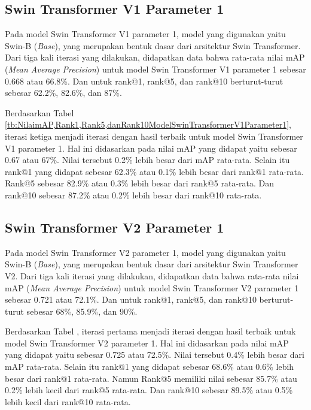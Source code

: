 \subsection{Swin Transformer V1 Parameter 1}

Pada model Swin Transformer V1 parameter 1, model yang digunakan yaitu Swin-B (\emph{Base}), yang merupakan bentuk 
dasar dari arsitektur Swin Transformer. Dari tiga kali iterasi yang dilakukan, didapatkan data bahwa rata-rata nilai 
mAP (\emph{Mean Average Precision}) untuk model Swin Transformer V1 parameter 1 sebesar 0.668 atau 66.8\%. Dan untuk 
rank@1, rank@5, dan rank@10 berturut-turut sebesar 62.2\%, 82.6\%, dan 87\%. 

Berdasarkan Tabel \ref{tb:NilaimAP,Rank1,Rank5,danRank10ModelSwinTransformerV1Parameter1}, iterasi ketiga menjadi 
iterasi dengan hasil terbaik untuk model Swin Transformer V1 parameter 1. 
Hal ini didasarkan pada nilai mAP yang didapat yaitu sebesar 0.67 atau 67\%. Nilai tersebut 0.2\% lebih besar dari 
mAP rata-rata. Selain itu rank@1 yang didapat sebesar 62.3\% atau 0.1\% lebih besar dari rank@1 rata-rata. Rank@5 sebesar 
82.9\% atau 0.3\% lebih besar dari rank@5 rata-rata. Dan rank@10 sebesar 87.2\% atau 0.2\% lebih besar dari rank@10 
rata-rata.

\subsection{Swin Transformer V2 Parameter 1}

Pada model Swin Transformer V2 parameter 1, model yang digunakan yaitu Swin-B (\emph{Base}), yang merupakan bentuk 
dasar dari arsitektur Swin Transformer V2. Dari tiga kali iterasi yang dilakukan, didapatkan data bahwa rata-rata nilai 
mAP (\emph{Mean Average Precision}) untuk model Swin Transformer V2 parameter 1 sebesar 0.721 atau 72.1\%. Dan untuk 
rank@1, rank@5, dan rank@10 berturut-turut sebesar 68\%, 85.9\%, dan 90\%. 

Berdasarkan Tabel , iterasi pertama menjadi 
iterasi dengan hasil terbaik untuk model Swin Transformer V2 parameter 1. 
Hal ini didasarkan pada nilai mAP yang didapat yaitu sebesar 0.725 atau 72.5\%. Nilai tersebut 0.4\% lebih besar dari 
mAP rata-rata. Selain itu rank@1 yang didapat sebesar 68.6\% atau 0.6\% lebih besar dari rank@1 rata-rata. Namun 
Rank@5 memiliki nilai sebesar 85.7\% atau 0.2\% lebih kecil dari rank@5 rata-rata. Dan rank@10 sebesar 89.5\% atau 0.5\% 
lebih kecil dari rank@10 rata-rata.

